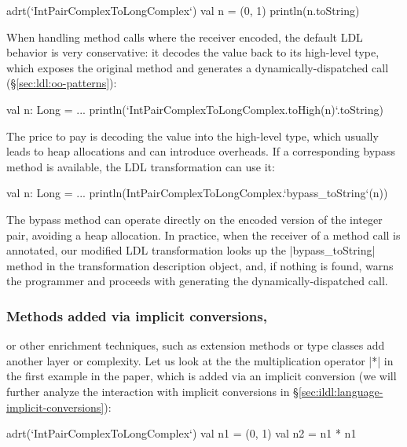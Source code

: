 \begin{lstlisting-nobreak}
adrt(`IntPairComplexToLongComplex`) {
  val n = (0, 1)
  println(n.toString)
}
\end{lstlisting-nobreak}

When handling method calls where the receiver encoded, the default LDL behavior is very conservative: it decodes the value back to its high-level type, which exposes the original method and generates a dynamically-dispatched call (\S\ref{sec:ldl:oo-patterns}):

\begin{lstlisting-nobreak}
val n: Long = ...
println(`IntPairComplexToLongComplex.toHigh(n)`.toString)
\end{lstlisting-nobreak}

The price to pay is decoding the value into the high-level type, which usually leads to heap allocations and can introduce overheads. If a corresponding bypass method is available, the LDL transformation can use it:

\begin{lstlisting-nobreak}
val n: Long = ...
println(IntPairComplexToLongComplex.`bypass_toString`(n))
\end{lstlisting-nobreak}

The bypass method can operate directly on the encoded version of the integer pair, avoiding a heap allocation. In practice, when the receiver of a method call is annotated, our modified LDL transformation looks up the |bypass_toString| method in the transformation description object, and, if nothing is found, warns the programmer and proceeds with generating the dynamically-dispatched call.

\subsubsection{Methods added via implicit conversions,} or other enrichment techniques, such as extension methods or type classes add another layer or complexity. Let us look at the the multiplication operator |*| in the first example in the paper, which is added via an implicit conversion (we will further analyze the interaction with implicit conversions in \S\ref{sec:ildl:language-implicit-conversions}):

\begin{lstlisting-nobreak}
adrt(`IntPairComplexToLongComplex`) {
  val n1 = (0, 1)
  val n2 = n1 * n1
}
\end{lstlisting-nobreak}

